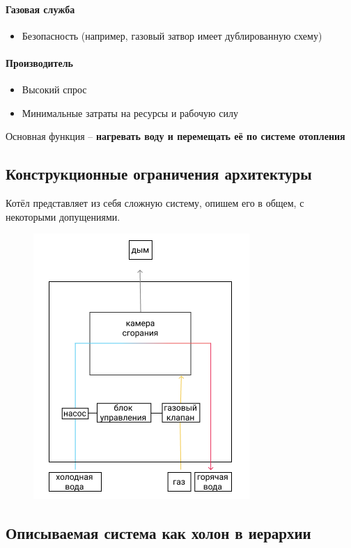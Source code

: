 \documentclass[bibliography=totocnumbered]{scrartcl}
\begin{document}
\paragraph{Газовая служба}
\begin{itemize}
  \item Безопасность (например, газовый затвор имеет дублированную схему)
\end{itemize}

\paragraph{Производитель}
\begin{itemize}
  \item Высокий спрос
  \item Минимальные затраты на ресурсы и рабочую силу
\end{itemize}
Основная функция -- \textbf{нагревать воду и перемещать её по системе отопления}

\subsection{Конструкционные ограничения архитектуры}
Котёл представляет из себя сложную систему, опишем его в общем, с некоторыми допущениями.

\begin{figure}[htp]
  \centering
  \includegraphics[scale=1.00]{arch.png}
\end{figure}

\subsection{Описываемая система как холон в иерархии}
\end{document}
